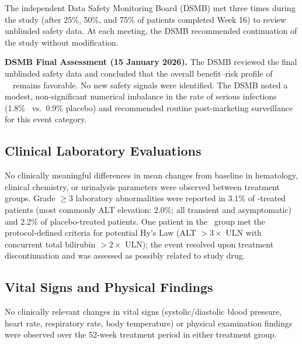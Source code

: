 The independent Data Safety Monitoring Board (DSMB) met three times during the study (after 25\%, 50\%, and 75\% of patients completed Week 16) to review unblinded safety data. At each meeting, the DSMB recommended continuation of the study without modification.

\begin{dsmbbox}
\textbf{DSMB Final Assessment (15 January 2026).} The DSMB reviewed the final unblinded safety data and concluded that the overall benefit--risk profile of \studydrug\ \studydose\ remains favorable. No new safety signals were identified. The DSMB noted a modest, non-significant numerical imbalance in the rate of serious infections (1.8\% \studydrug\ vs.\ 0.9\% placebo) and recommended routine post-marketing surveillance for this event category.
\end{dsmbbox}

\subsection{Clinical Laboratory Evaluations}

No clinically meaningful differences in mean changes from baseline in hematology, clinical chemistry, or urinalysis parameters were observed between treatment groups. Grade $\ge 3$ laboratory abnormalities were reported in 3.1\% of \studydrug-treated patients (most commonly ALT elevation: 2.0\%; all transient and asymptomatic) and 2.2\% of placebo-treated patients. One patient in the \studydrug\ group met the protocol-defined criteria for potential Hy's Law (ALT $> 3\times$ ULN with concurrent total bilirubin $> 2\times$ ULN); the event resolved upon treatment discontinuation and was assessed as possibly related to study drug.

\subsection{Vital Signs and Physical Findings}

No clinically relevant changes in vital signs (systolic/diastolic blood pressure, heart rate, respiratory rate, body temperature) or physical examination findings were observed over the 52-week treatment period in either treatment group.

\newpage

